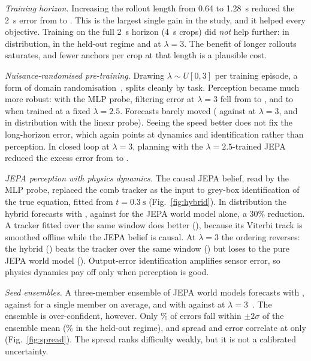 \documentclass[10pt,journal]{IEEEtran}
\begin{document}
\emph{Training horizon.} Increasing the rollout length from 0.64 to \SI{1.28}{\second} reduced the \SI{2}{\second} error from \nAblShort{} to \nJepaSzH{}. This is the largest single gain in the study, and it helped every objective. Training on the full \SI{2}{\second} horizon (\SI{4}{\second} crops) did \emph{not} help further: \nAblXlong{} in distribution, \nXlongOOD{} in the held-out regime and \nXlongLamThree{} at $\lambda=3$. The benefit of longer rollouts saturates, and fewer anchors per crop at that length is a plausible cost.

\emph{Nuisance-randomised pre-training.} Drawing $\lambda\sim U[0,3]$ per training episode, a form of domain randomisation~\cite{tobin2017domain}, splits cleanly by task. Perception became much more robust: with the MLP probe, filtering error at $\lambda=3$ fell from \nJepaSzMlpFiltLamThree{} to \nMixMlpFiltLamThree{}, and to \nHiMlpFiltLamThree{} when trained at a fixed $\lambda=2.5$. Forecasts barely moved (\nJepaSzMlpLamThree{} against \nMixMlpLamThree{} at $\lambda=3$, and \nAblMix{} in distribution with the linear probe). Seeing the speed better does not fix the long-horizon error, which again points at dynamics and identification rather than perception. In closed loop at $\lambda=3$, planning with the $\lambda=2.5$-trained JEPA reduced the excess error from \nMpcJepaLamThree{} to \nMpcJepaHiLamThree{}.

\emph{JEPA perception with physics dynamics.} The causal JEPA belief, read by the MLP probe, replaced the comb tracker as the input to grey-box identification of the true equation, fitted from $t=\SI{0.3}{\second}$ (Fig.~\ref{fig:hybrid}). In distribution the hybrid forecasts with \nHybJepaId{}, against \nJepaSzH{} for the JEPA world model alone, a 30\% reduction. A tracker fitted over the same window does better (\nHybTrackerId{}), because its Viterbi track is smoothed offline while the JEPA belief is causal. At $\lambda=3$ the ordering reverses: the hybrid (\nHybJepaLamThree{}) beats the tracker over the same window (\nHybTrackerLamThree{}) but loses to the pure JEPA world model (\nAblJepaSzLamThree{}). Output-error identification amplifies sensor error, so physics dynamics pay off only when perception is good.

\emph{Seed ensembles.} A three-member ensemble of JEPA world models forecasts with \nEnsJepaId{}, against \nEnsSingleJepaId{} for a single member on average, and with \nEnsJepaLamThree{} against \nEnsSingleJepaLamThree{} at $\lambda=3$~\cite{lakshminarayanan2017ensembles}. The ensemble is over-confident, however. Only \nEnsCovJepaId\% of errors fall within $\pm2\sigma$ of the ensemble mean (\nEnsCovJepaOOD\% in the held-out regime), and spread and error correlate at only \nEnsCorrJepaId{} (Fig.~\ref{fig:spread}). The spread ranks difficulty weakly, but it is not a calibrated uncertainty.
\end{document}
